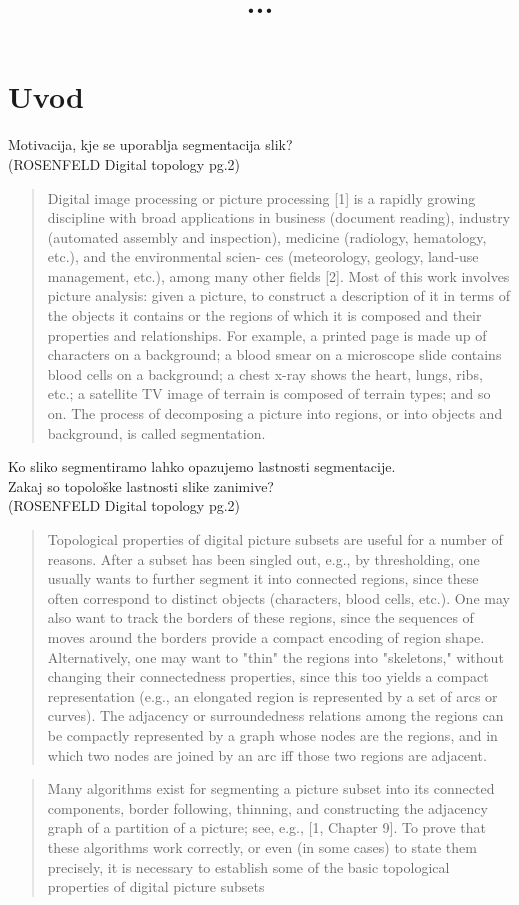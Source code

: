 \documentclass[mat1]{fmfdelo}
\title{...}
\begin{document}
\section{Uvod}
Motivacija, kje se uporablja segmentacija slik?\\
(ROSENFELD Digital topology pg.2) 
\begin{quote}
  
  Digital image processing or picture processing [1] is a rapidly growing discipline with broad applications in business (document reading), industry (automated assembly and inspection), medicine (radiology, hematology, etc.), and the environmental scien- ces (meteorology, geology, land-use management, etc.), among many other fields [2]. Most of this work involves picture analysis: given a picture, to construct a description of it in terms of the objects it contains or the regions of which it is composed and their properties and relationships. For example, a printed page is made up of characters on a background; a blood smear on a microscope slide contains blood cells on a background; a chest x-ray shows the heart, lungs, ribs, etc.; a satellite TV image of terrain is composed of terrain types; and so on. The process of decomposing a picture into regions, or into objects and background, is called segmentation.
\end{quote}
Ko sliko segmentiramo lahko opazujemo lastnosti segmentacije.\\
Zakaj so topološke lastnosti slike zanimive?\\
(ROSENFELD Digital topology pg.2) 
\begin{quote}
  Topological properties of digital picture subsets are useful for a number of reasons. After a subset has been singled out, e.g., by thresholding, one usually wants to further segment it into connected regions, since these often correspond to distinct objects (characters, blood cells, etc.). One may also want to track the borders of these regions, since the sequences of moves around the borders provide a compact encoding of region shape. Alternatively, one may want to "thin" the regions into "skeletons," without changing their connectedness properties, since this too yields a compact representation (e.g., an elongated region is represented by a set of arcs or curves). The adjacency or surroundedness relations among the regions can be compactly represented by a graph whose nodes are the regions, and in which two nodes are joined by an arc iff those two regions are adjacent.
\end{quote}
\begin{quote}
  Many algorithms exist for segmenting a picture subset into its connected components, border following, thinning, and constructing the adjacency graph of a partition of a picture; see, e.g., [1, Chapter 9]. To prove that these algorithms work correctly, or even (in some cases) to state them precisely, it is necessary to establish some of the basic topological properties of digital picture subsets
\end{quote}
\end{document}
